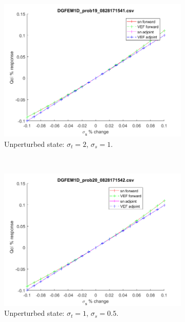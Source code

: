 \documentclass{article}
\newcommand{\sigt}{\sigma_t}
\newcommand{\sigs}{\sigma_s}
\begin{document}
\begin{figure}[H]
\label{HomoPerts}
\centering
\begin{subfigure}{.65\textwidth}
  \centering
  \includegraphics[width=.98\linewidth]{figures/19sigsSens.png}
  \caption{Unperturbed state: $\sigt=2$, $\sigs=1$.}
  \label{fig:sfig1}
\end{subfigure}%
\\
\begin{subfigure}{.65\textwidth}
  \centering
  \includegraphics[width=.98\linewidth]{figures/20sigsSens.png}
  \caption{Unperturbed state: $\sigt=1$, $\sigs=0.5$.}
  \label{fig:sfig2}
\end{subfigure}
\\
\begin{subfigure}{.65\textwidth}

\end{subfigure}
\end{figure}
\end{document}
